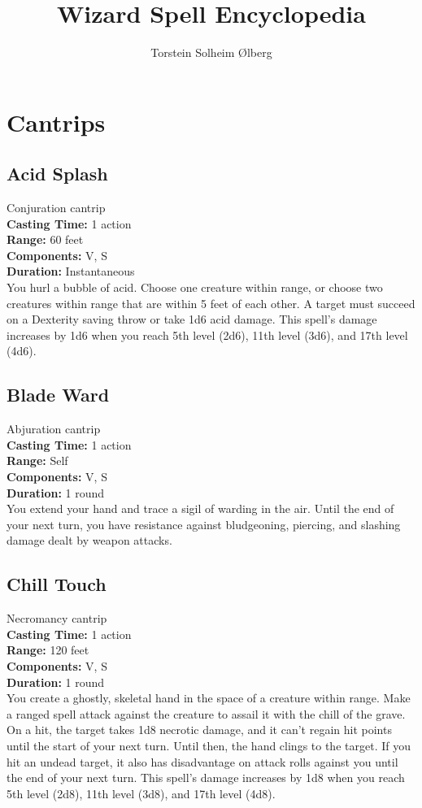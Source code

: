 \documentclass[11pt, A4paper, english]{article}
\author{Torstein Solheim Ølberg}
\title{Wizard Spell Encyclopedia}
\begin{document}
\maketitle

\tableofcontents

	\section{Cantrips}
		\subsection{Acid Splash}
Conjuration cantrip \\
\textbf{Casting Time:} 1 action \\
\textbf{Range:} 60 feet \\
\textbf{Components:} V, S \\
\textbf{Duration:} Instantaneous \\
You hurl a bubble of acid. Choose one creature within range, or choose two creatures within range that are within 5 feet of each other. A target must succeed on a Dexterity saving throw or take  1d6 acid damage. This spell's damage increases by 1d6 when you reach 5th level (2d6), 11th level (3d6), and 17th level (4d6).

		\subsection{Blade Ward}
Abjuration cantrip \\
\textbf{Casting Time:} 1 action \\
\textbf{Range:} Self \\
\textbf{Components:} V, S \\
\textbf{Duration:} 1 round \\
You extend your hand and trace a sigil of warding in the air. Until the end of your next turn, you have resistance against bludgeoning, piercing, and slashing damage dealt by weapon attacks.

		\subsection{Chill Touch}
Necromancy cantrip \\
\textbf{Casting Time:} 1 action \\
\textbf{Range:} 120 feet \\
\textbf{Components:} V, S \\
\textbf{Duration:} 1 round \\
You create a ghostly, skeletal hand in the space of a creature within range. Make a ranged spell attack against the creature to assail it with the chill of the grave. On a hit, the target takes 1d8 necrotic damage, and it can't regain hit points until the start of your next turn. Until then, the hand clings to the target. If you hit an undead target, it also has disadvantage on attack rolls against you until the end of your next turn. This spell's damage increases by 1d8 when you reach 5th level (2d8),  11th level (3d8), and 17th level (4d8).
\end{document}
